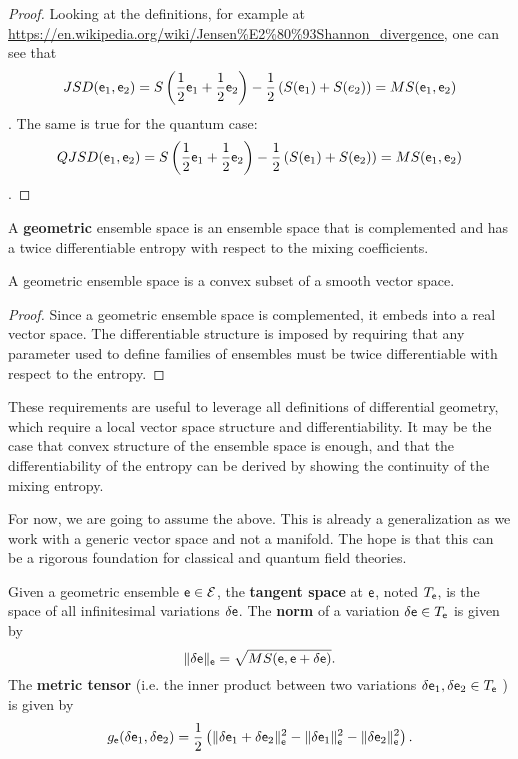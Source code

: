 \begin{proof}
	Looking at the definitions, for example at \url{https://en.wikipedia.org/wiki/Jensen%E2%80%93Shannon_divergence}, one can see that
	$$ JSD(\mathsf{e}_1, \mathsf{e}_2) = S\left(\frac{1}{2}\mathsf{e}_1 + \frac{1}{2}\mathsf{e}_2 \right)  - \frac{1}{2} \left(S(\mathsf{e}_1) + S(e_2)\right) = MS(\mathsf{e}_1, \mathsf{e}_2)$$.
	The same is true for the quantum case:
	$$ QJSD(\mathsf{e}_1, \mathsf{e}_2) = S\left(\frac{1}{2}\mathsf{e}_1 + \frac{1}{2}\mathsf{e}_2 \right)  - \frac{1}{2} \left(S(\mathsf{e}_1) + S(\mathsf{e}_2)\right) = MS(\mathsf{e}_1, \mathsf{e}_2)$$.
\end{proof}

\begin{defn}
	A \textbf{geometric} ensemble space is an ensemble space that is complemented and has a twice differentiable entropy with respect to the mixing coefficients.
\end{defn}

\begin{coro}
	A geometric ensemble space is a convex subset of a smooth vector space.
\end{coro}

\begin{proof}
	Since a geometric ensemble space is complemented, it embeds into a real vector space. The differentiable structure is imposed by requiring that any parameter used to define families of ensembles must be twice differentiable with respect to the entropy.
\end{proof}

\begin{remark}
	These requirements are useful to leverage all definitions of differential geometry, which require a local vector space structure and differentiability. It may be the case that convex structure of the ensemble space is enough, and that the differentiability of the entropy can be derived by showing the continuity of the mixing entropy.
	
	For now, we are going to assume the above. This is already a generalization as we work with a generic vector space and not a manifold. The hope is that this can be a rigorous foundation for classical and quantum field theories.
\end{remark}

\begin{defn}
	Given a geometric ensemble $\mathsf{e} \in \mathcal{E}$, the \textbf{tangent space} at $\mathsf{e}$, noted $T_{\mathsf{e}}$, is the space of all infinitesimal variations $\delta \mathsf{e}$. The \textbf{norm} of a variation $\delta \mathsf{e} \in T_{\mathsf{e}}$ is given by
	$$ \lVert \delta \mathsf{e} \rVert_{\mathsf{e}} = \sqrt{ MS(\mathsf{e}, \mathsf{e} + \delta \mathsf{e}) }.$$
	The \textbf{metric tensor} (i.e. the inner product between two variations $\delta \mathsf{e}_1 , \delta \mathsf{e}_2 \in T_{\mathsf{e}}$ ) is given by
	$$ g_{\mathsf{e}}( \delta \mathsf{e}_1, \delta \mathsf{e}_2 ) = \frac{1}{2} \left( \lVert \delta \mathsf{e}_1 + \delta \mathsf{e}_2 \rVert_{\mathsf{e}}^2 - \lVert \delta \mathsf{e}_1 \rVert_{\mathsf{e}}^2 - \lVert \delta \mathsf{e}_2 \rVert_{\mathsf{e}}^2 \right).$$
\end{defn}

